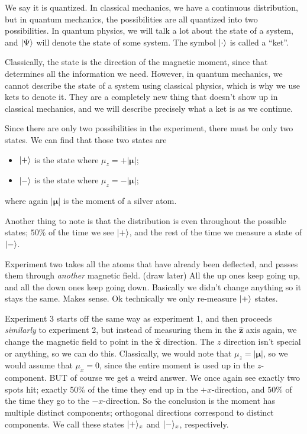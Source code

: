 We say it is quantized. In classical mechanics, we have a continuous distribution, but in quantum mechanics, the possibilities are all quantized into two possibilities. In quantum physics, we will talk a lot about the state of a system, and $\lvert\Psi  \rangle$ will denote the state of some system. The symbol $\lvert\cdot \rangle$ is called a ``ket''.

Classically, the state is the direction of the magnetic moment, since that determines all the information we need. However, in quantum mechanics, we cannot describe the state of a system using classical physics, which is why we use kets to denote it. They are a completely new thing that doesn't show up in classical mechanics, and we will describe precisely what a ket is as we continue.

Since there are only two possibilities in the experiment, there must be only two states. We can find that those two states are
\begin{itemize}
	\item $\lvert+\rangle $ is the state where $\mu_z = +\left| \boldsymbol{\mu}  \right| $;
	\item $\lvert-\rangle$ is the state where $\mu _z = -\left| \boldsymbol{\mu}  \right| $;
\end{itemize}
where again $\left| \boldsymbol{\mu}  \right| $ is  the moment of a silver atom.

Another thing to note is that the distribution is even throughout the possible states; $50\%$ of the time we see $\lvert+\rangle$, and the rest of the time we measure a state of $\lvert-\rangle$.

Experiment two takes all the atoms that have already been deflected, and passes them through \emph{another} magnetic field. (draw later) All the up ones keep going up, and all the down ones keep going down. Basically we didn't change anything so it stays the same. Makes sense. Ok technically we only re-measure $\lvert+\rangle$ states.

Experiment 3 starts off the same way as experiment 1, and then proceeds \emph{similarly} to experiment 2, but instead of measuring them in the $\mathbf{\hat{z}}$ axis again, we change the magnetic field to point in the $\mathbf{\hat{x}}$ direction. The $z$ direction isn't special or anything, so we can do this. Classically, we would note that $\mu_z = \left| \boldsymbol{\mu}  \right| $, so we would assume that $\mu _x=0$, since the entire moment is used up in the $z$-component. BUT of course we get a weird answer. We once again see exactly two spots hit; exactly 50\% of the time they end up in the $+x$-direction, and $50\%$ of the time they go to the $-x$-direction. So the conclusion is the moment has multiple distinct components; orthogonal directions correspond to distinct components. We call these states $\lvert+\rangle_x$ and $\lvert-\rangle_x$, respectively.

